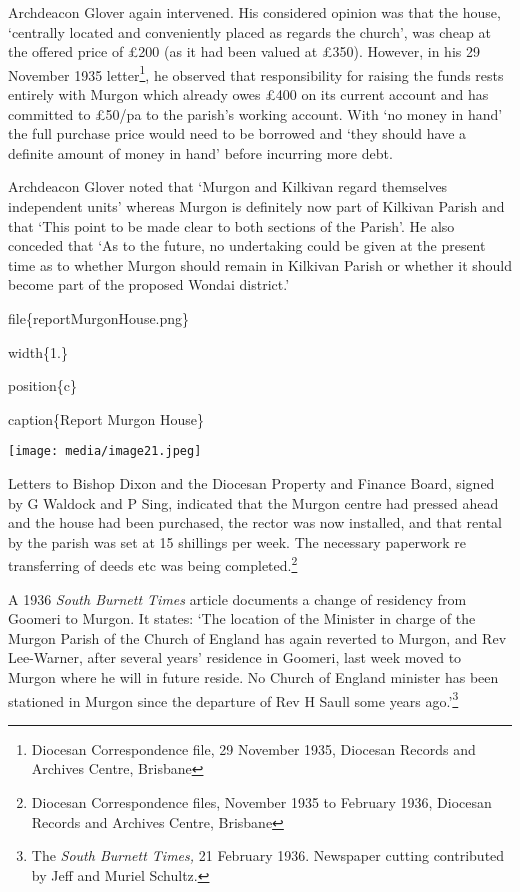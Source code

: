Archdeacon Glover again intervened. His considered opinion was that the house, `centrally located and conveniently placed as regards the church', was cheap at the offered price of £200 (as it had been valued at £350). However, in his 29 November 1935 letter\footnote{Diocesan Correspondence file, 29 November 1935, Diocesan Records and Archives Centre, Brisbane}, he observed that responsibility for raising the funds rests entirely with Murgon which already owes £400 on its current account and has committed to £50/pa to the parish's working account. With `no money in hand' the full purchase price would need to be borrowed and `they should have a definite amount of money in hand' before incurring more debt.

Archdeacon Glover noted that `Murgon and Kilkivan regard themselves independent units' whereas Murgon is definitely now part of Kilkivan Parish and that `This point to be made clear to both sections of the Parish'. He also conceded that `As to the future, no undertaking could be given at the present time as to whether Murgon should remain in Kilkivan Parish or whether it should become part of the proposed Wondai district.'

file\{reportMurgonHouse.png\}

width\{1.\}

position\{c\}

caption\{Report Murgon House\}

\texttt{[image: media/image21.jpeg]}

Letters to Bishop Dixon and the Diocesan Property and Finance Board, signed by G Waldock and P Sing, indicated that the Murgon centre had pressed ahead and the house had been purchased, the rector was now installed, and that rental by the parish was set at 15 shillings per week. The necessary paperwork re transferring of deeds etc was being completed.\footnote{Diocesan Correspondence files, November 1935 to February 1936, Diocesan Records and Archives Centre, Brisbane}

A 1936 \emph{South Burnett Times} article documents a change of residency from Goomeri to Murgon. It states: `The location of the Minister in charge of the Murgon Parish of the Church of England has again reverted to Murgon, and Rev Lee-Warner, after several years' residence in Goomeri, last week moved to Murgon where he will in future reside. No Church of England minister has been stationed in Murgon since the departure of Rev H Saull some years ago.'\footnote{The \emph{South Burnett Times,} 21 February 1936. Newspaper cutting contributed by Jeff and Muriel Schultz.}

